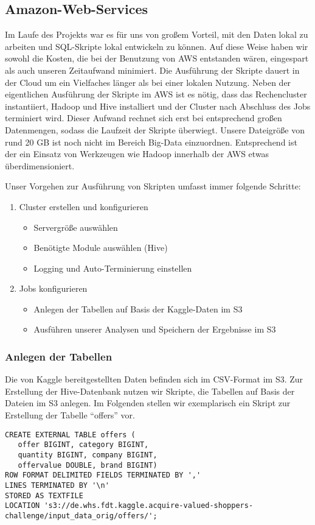 \subsection{Amazon-Web-Services}
Im Laufe des Projekts war es für uns von großem Vorteil, mit den Daten lokal zu arbeiten und SQL-Skripte lokal entwickeln zu können. Auf diese Weise haben wir sowohl die Kosten, die bei der Benutzung von AWS entstanden wären, eingespart als auch unseren Zeitaufwand minimiert. Die Ausführung der Skripte dauert in der Cloud um ein Vielfaches länger als bei einer lokalen Nutzung. Neben der eigentlichen Ausführung der Skripte im AWS ist es nötig, dass das Rechencluster instantiiert, Hadoop und Hive installiert und der Cluster nach Abschluss des Jobs terminiert wird. Dieser Aufwand rechnet sich erst bei entsprechend großen Datenmengen, sodass die Laufzeit der Skripte überwiegt. Unsere Dateigröße von rund 20 GB ist noch nicht im Bereich Big-Data einzuordnen. Entsprechend ist der ein Einsatz von Werkzeugen wie Hadoop innerhalb der AWS etwas überdimensioniert.

Unser Vorgehen zur Ausführung von Skripten umfasst immer folgende Schritte:
\begin{enumerate}
\item Cluster erstellen und konfigurieren
	\begin{itemize}
	\item Servergröße auswählen
	\item Benötigte Module auswählen (Hive)
	\item Logging und Auto-Terminierung einstellen
	\end{itemize}
\item Jobs konfigurieren
	\begin{itemize}
	\item Anlegen der Tabellen auf Basis der Kaggle-Daten im S3
	\item Ausführen unserer Analysen und Speichern der Ergebnisse im S3
	\end{itemize}
\end{enumerate}

\subsubsection{Anlegen der Tabellen}
Die von Kaggle bereitgestellten Daten befinden sich im CSV-Format im S3.
Zur Erstellung der Hive-Datenbank nutzen wir Skripte, die Tabellen auf Basis der Dateien im S3 anlegen. Im Folgenden stellen wir exemplarisch ein Skript zur Erstellung der Tabelle "`offers"' vor.
\begin{lstlisting}[style=hive]
CREATE EXTERNAL TABLE offers (
   offer BIGINT, category BIGINT, 
   quantity BIGINT, company BIGINT, 
   offervalue DOUBLE, brand BIGINT)
ROW FORMAT DELIMITED FIELDS TERMINATED BY ','
LINES TERMINATED BY '\n'
STORED AS TEXTFILE
LOCATION 's3://de.whs.fdt.kaggle.acquire-valued-shoppers- challenge/input_data_orig/offers/';
\end{lstlisting}

